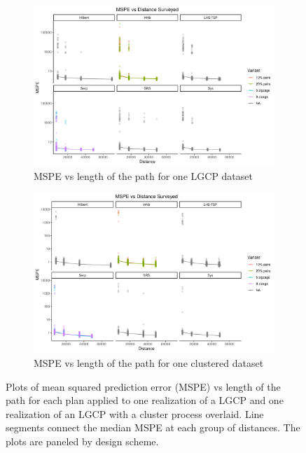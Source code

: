 \documentclass[review]{elsarticle}
\begin{document}
\begin{figure}

\begin{subfigure}{5in}
\includegraphics[width=5in]{../graphics/MSPE-LGCP000004.png}
\caption{MSPE vs length of the path for one LGCP dataset}
\label{mspelgcp}
\end{subfigure}

\begin{subfigure}{5in}
\includegraphics[width=5in]{../graphics/MSPE-Cluster000004.png}
\caption{MSPE vs length of the path for one clustered dataset}
\label{mspecluster}
\end{subfigure}

\caption{Plots of mean squared prediction error (MSPE) vs length of the path
for each plan applied to one realization of a LGCP and one realization of
an LGCP with a cluster process overlaid. Line segments connect the
median MSPE at each group of distances. The plots are paneled by design
scheme.}
\label{msperesults}
\end{figure}
\end{document}
